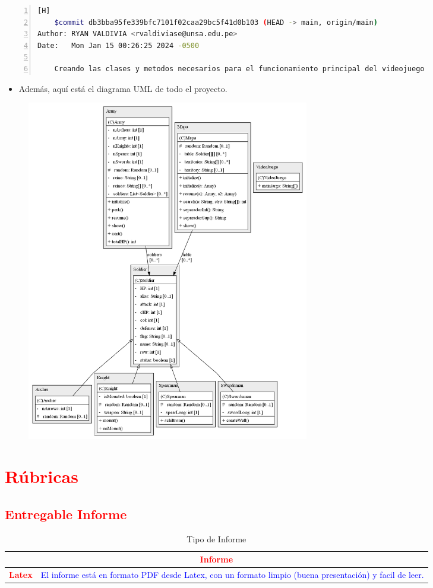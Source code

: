 \documentclass{article}
\begin{document}
	\begin{lstlisting}[language=bash,caption={Commit}, numbers=left][H]
	$commit db3bba95fe339bfc7101f02caa29bc5f41d0b103 (HEAD -> main, origin/main)
Author: RYAN VALDIVIA <rvaldiviase@unsa.edu.pe>
Date:   Mon Jan 15 00:26:25 2024 -0500

    Creando las clases y metodos necesarios para el funcionamiento principal del videojuego
	\end{lstlisting}
	\begin{itemize}	
		\item Además, aquí está el diagrama UML de todo el proyecto.
	\end{itemize}
	\begin{figure}[H]
		\centering
	\includegraphics[width=0.6\textwidth,keepaspectratio]{img/VideoJuego_structure.png}
	\end{figure}
	
	
	\section{\textcolor{red}{Rúbricas}}
	
	\subsection{\textcolor{red}{Entregable Informe}}
	\begin{table}[H]
		\caption{Tipo de Informe}
		\setlength{\tabcolsep}{0.5em} %
		{\renewcommand{\arraystretch}{1.5}%
		\begin{tabular}{|p{3cm}|p{12cm}|}
			\hline
			\multicolumn{2}{|c|}{\textbf{\textcolor{red}{Informe}}}  \\
			\hline 
			\textbf{\textcolor{red}{Latex}} & \textcolor{blue}{El informe está en formato PDF desde Latex,  con un formato limpio (buena presentación) y facil de leer.}   \\ 
			\hline 
			
			
		\end{tabular}
	}
	\end{table}
	
\end{document}
